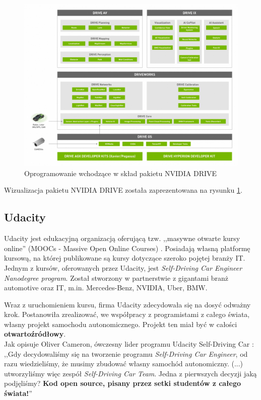 \begin{figure}[h]
\begin{center}
\includegraphics[width=16cm]{resources/figures/nvidia-drive-software-stack.jpg}
\caption{Oprogramowanie wchodzące w skład pakietu NVIDIA DRIVE}
\label{NvidiaDriveSoftwareStack}
\end{center}
\end{figure}
\vspace{0.5cm}
Wizualizacja pakietu NVIDIA DRIVE została zaprezentowana na rysunku \ref{NvidiaDriveSoftwareStack}.

\subsection{Udacity}
Udacity jest edukacyjną organizacją oferującą tzw. ,,masywne otwarte kursy online'' (MOOCs - Massive Open Online Courses) \cite{mooc:guide}. Posiadają własną platformę kursową, na której publikowane są kursy dotyczące szeroko pojętej branży IT. \\
Jednym z kursów, oferowanych przez Udacity, jest \textit{Self-Driving Car Engineer Nanodegree program}. Został stworzony w partnerstwie z gigantami branż automotive oraz IT, m.in. Mercedes-Benz, NVIDIA, Uber, BMW.

Wraz z uruchomieniem kursu, firma Udacity zdecydowała się na dosyć odważny krok. Postanowiła zrealizować, we współpracy z programistami z całego świata, własny projekt samochodu autonomicznego. Projekt ten miał być w całości \textbf{otwartoźródłowy}. \\
Jak opisuje Oliver Cameron, ówczesny lider programu Udacity Self-Driving Car \cite{udacity:selfDrivingCar}: \\
,,Gdy decydowaliśmy się na tworzenie programu  \textit{Self-Driving Car Engineer}, od razu wiedzieliśmy, że musimy zbudować własny samochód autonomiczny. (...) utworzyliśmy więc zespół \textit{Self-Driving Car Team}. Jedna z pierwszych decyzji jaką podjęliśmy? \textbf{Kod open source, pisany przez setki studentów z całego świata!}''

